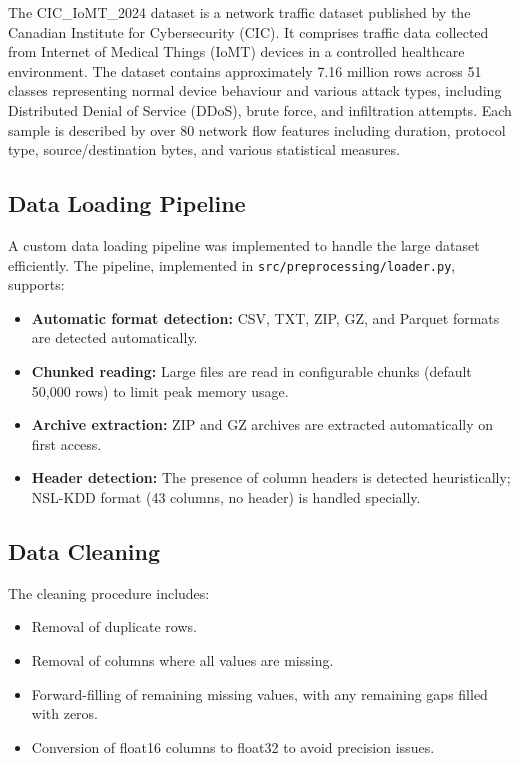 \documentclass[12pt,a4paper,oneside]{report}
\begin{document}
The CIC\_IoMT\_2024 dataset is a network traffic dataset published by the Canadian Institute for Cybersecurity (CIC). It comprises traffic data collected from Internet of Medical Things (IoMT) devices in a controlled healthcare environment. The dataset contains approximately 7.16 million rows across 51 classes representing normal device behaviour and various attack types, including Distributed Denial of Service (DDoS), brute force, and infiltration attempts. Each sample is described by over 80 network flow features including duration, protocol type, source/destination bytes, and various statistical measures.

\subsection{Data Loading Pipeline}

A custom data loading pipeline was implemented to handle the large dataset efficiently. The pipeline, implemented in \texttt{src/preprocessing/loader.py}, supports:
\begin{itemize}
    \item \textbf{Automatic format detection:} CSV, TXT, ZIP, GZ, and Parquet formats are detected automatically.
    \item \textbf{Chunked reading:} Large files are read in configurable chunks (default 50,000 rows) to limit peak memory usage.
    \item \textbf{Archive extraction:} ZIP and GZ archives are extracted automatically on first access.
    \item \textbf{Header detection:} The presence of column headers is detected heuristically; NSL-KDD format (43 columns, no header) is handled specially.
\end{itemize}

\subsection{Data Cleaning}

The cleaning procedure includes:
\begin{itemize}
    \item Removal of duplicate rows.
    \item Removal of columns where all values are missing.
    \item Forward-filling of remaining missing values, with any remaining gaps filled with zeros.
    \item Conversion of float16 columns to float32 to avoid precision issues.
\end{itemize}
\end{document}
